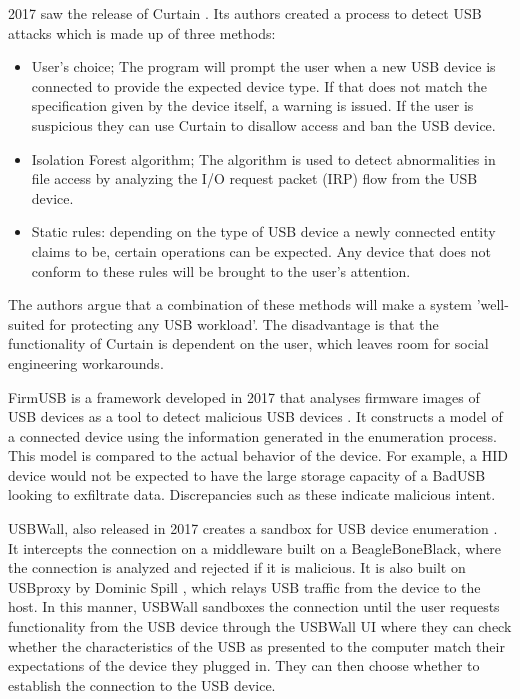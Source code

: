 2017 saw the release of Curtain \cite{fuCurtainKeepYour2017}. Its authors created a process to detect USB attacks which is made up of three methods:
\begin{itemize}
    \item User's choice; The program will prompt the user when a new USB device is connected to provide the expected device type. If that does not match the specification given by the device itself, a warning is issued. If the user is suspicious they can use Curtain to disallow access and ban the USB device.
    \item Isolation Forest algorithm; The algorithm is used to detect abnormalities in file access by analyzing the I/O request packet (IRP) flow from the USB device. 
    \item Static rules: depending on the type of USB device a newly connected entity claims to be, certain operations can be expected. Any device that does not conform to these rules will be brought to the user's attention. 
\end{itemize}
The authors argue that a combination of these methods will make a system 'well-suited for protecting any USB workload'.  The disadvantage is that the functionality of Curtain is dependent on the user, which leaves room for social engineering workarounds.  

FirmUSB is a framework developed in 2017 that analyses firmware images of USB devices as a tool to detect malicious USB devices \cite{hernandezFirmUSBVettingUSB2017}. It constructs a model of a connected device using the information generated in the enumeration process. This model is compared to the actual behavior of the device. For example, a HID device would not be expected to have the large storage capacity of a BadUSB looking to exfiltrate data. Discrepancies such as these indicate malicious intent. 

USBWall, also released in 2017 creates a sandbox for USB device enumeration \cite{kangUSBWallNovelSecurity2017}. It intercepts the connection on a middleware built on a BeagleBoneBlack, where the connection is analyzed and rejected if it is malicious. It is also built on USBproxy by Dominic Spill \cite{dominicspillShmooCon2014Open2014}, which relays USB traffic from the device to the host. In this manner, USBWall sandboxes the connection until the user requests functionality from the USB device through the USBWall UI where they can check whether the characteristics of the USB as presented to the computer match their expectations of the device they plugged in. They can then choose whether to establish the connection to the USB device.  

